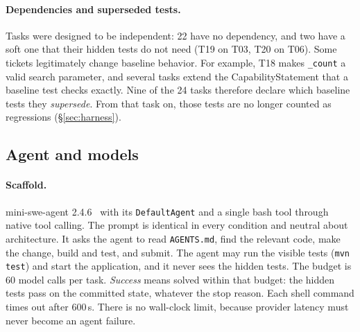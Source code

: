 \documentclass[10pt]{article}
\newcommand{\code}[1]{\texttt{#1}}
\begin{document}
\paragraph{Dependencies and superseded tests.} Tasks were designed to be independent: 22 have no
dependency, and two have a soft one that their hidden tests do not need (T19 on T03, T20 on T06).
Some tickets legitimately change baseline behavior. For example, T18 makes \code{\_count} a valid
search parameter, and several tasks extend the CapabilityStatement that a baseline test checks
exactly. Nine of the 24 tasks therefore declare which baseline tests they \emph{supersede}. From
that task on, those tests are no longer counted as regressions (\S\ref{sec:harness}).

\subsection{Agent and models}\label{sec:agent}

\paragraph{Scaffold.} mini-swe-agent 2.4.6~\citep{minisweagent} with its \code{DefaultAgent}
and a single bash tool through native tool calling. The prompt is identical in every condition and
neutral about architecture. It asks the agent to read \code{AGENTS.md}, find the relevant code,
make the change, build and test, and submit. The agent may run the visible tests (\code{mvn test})
and start the application, and it never sees the hidden tests. The budget is 60 model calls per task.
\emph{Success} means solved within that budget: the hidden tests pass on the committed state,
whatever the stop reason. Each shell command times out after 600\,s. There is no wall-clock limit,
because provider latency must never become an agent failure.
\end{document}
